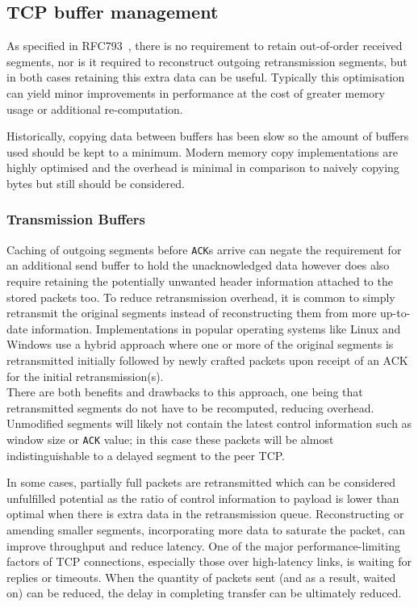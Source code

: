     \subsection{TCP buffer management}
        As specified in RFC793~\cite{rfc793}, there is no requirement to retain out-of-order received segments, nor is it required to reconstruct outgoing retransmission segments, but in both cases retaining this extra data can be useful. Typically this optimisation can yield minor improvements in performance at the cost of greater memory usage or additional re-computation.

        Historically, copying data between buffers has been slow so the amount of buffers used should be kept to a minimum. Modern memory copy implementations are highly optimised and the overhead is minimal in comparison to naively copying bytes but still should be considered.

        \subsubsection{Transmission Buffers}
            Caching of outgoing segments before \texttt{ACK}s arrive can negate the requirement for an additional send buffer to hold the unacknowledged data however does also require retaining the potentially unwanted header information attached to the stored packets too. To reduce retransmission overhead, it is common to simply retransmit the original segments instead of reconstructing them from more up-to-date information. Implementations in popular operating systems like Linux and Windows use a hybrid approach where one or more of the original segments is retransmitted initially followed by newly crafted packets upon receipt of an ACK for the initial retransmission(s). \\ %
            There are both benefits and drawbacks to this approach, one being that retransmitted segments do not have to be recomputed, reducing overhead. Unmodified segments will likely not contain the latest control information such as window size or \texttt{ACK} value; in this case these packets will be almost indistinguishable to a delayed segment to the peer TCP\@.

            In some cases, partially full packets are retransmitted which can be considered unfulfilled potential as the ratio of control information to payload is lower than optimal when there is extra data in the retransmission queue. Reconstructing or amending smaller segments, incorporating more data to saturate the packet, can improve throughput and reduce latency. One of the major performance-limiting factors of TCP connections, especially those over high-latency links, is waiting for replies or timeouts. When the quantity of packets sent (and as a result, waited on) can be reduced, the delay in completing transfer can be ultimately reduced.

